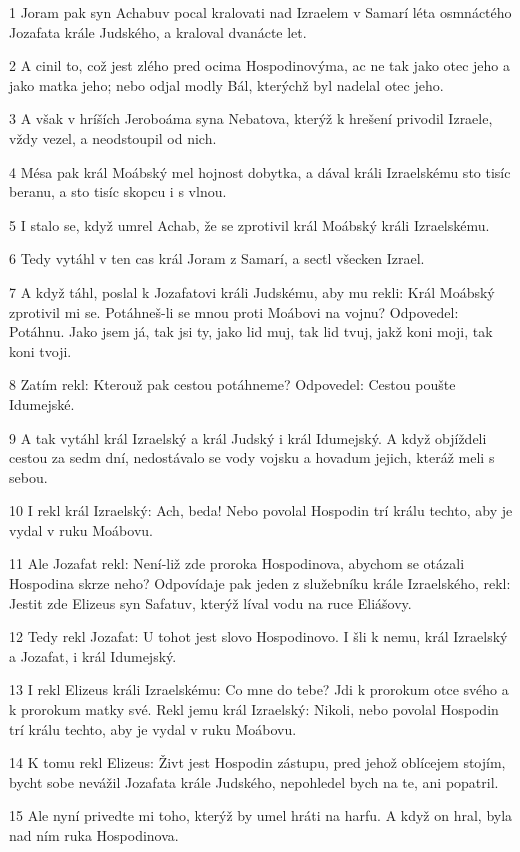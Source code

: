 \par 1 Joram pak syn Achabuv pocal kralovati nad Izraelem v Samarí léta osmnáctého Jozafata krále Judského, a kraloval dvanácte let.
\par 2 A cinil to, což jest zlého pred ocima Hospodinovýma, ac ne tak jako otec jeho a jako matka jeho; nebo odjal modly Bál, kterýchž byl nadelal otec jeho.
\par 3 A však v hríších Jeroboáma syna Nebatova, kterýž k hrešení privodil Izraele, vždy vezel, a neodstoupil od nich.
\par 4 Mésa pak král Moábský mel hojnost dobytka, a dával králi Izraelskému sto tisíc beranu, a sto tisíc skopcu i s vlnou.
\par 5 I stalo se, když umrel Achab, že se zprotivil král Moábský králi Izraelskému.
\par 6 Tedy vytáhl v ten cas král Joram z Samarí, a sectl všecken Izrael.
\par 7 A když táhl, poslal k Jozafatovi králi Judskému, aby mu rekli: Král Moábský zprotivil mi se. Potáhneš-li se mnou proti Moábovi na vojnu? Odpovedel: Potáhnu. Jako jsem já, tak jsi ty, jako lid muj, tak lid tvuj, jakž koni moji, tak koni tvoji.
\par 8 Zatím rekl: Kterouž pak cestou potáhneme? Odpovedel: Cestou poušte Idumejské.
\par 9 A tak vytáhl král Izraelský a král Judský i král Idumejský. A když objíždeli cestou za sedm dní, nedostávalo se vody vojsku a hovadum jejich, kteráž meli s sebou.
\par 10 I rekl král Izraelský: Ach, beda! Nebo povolal Hospodin trí králu techto, aby je vydal v ruku Moábovu.
\par 11 Ale Jozafat rekl: Není-liž zde proroka Hospodinova, abychom se otázali Hospodina skrze neho? Odpovídaje pak jeden z služebníku krále Izraelského, rekl: Jestit zde Elizeus syn Safatuv, kterýž líval vodu na ruce Eliášovy.
\par 12 Tedy rekl Jozafat: U tohot jest slovo Hospodinovo. I šli k nemu, král Izraelský a Jozafat, i král Idumejský.
\par 13 I rekl Elizeus králi Izraelskému: Co mne do tebe? Jdi k prorokum otce svého a k prorokum matky své. Rekl jemu král Izraelský: Nikoli, nebo povolal Hospodin trí králu techto, aby je vydal v ruku Moábovu.
\par 14 K tomu rekl Elizeus: Živt jest Hospodin zástupu, pred jehož oblícejem stojím, bycht sobe nevážil Jozafata krále Judského, nepohledel bych na te, ani popatril.
\par 15 Ale nyní privedte mi toho, kterýž by umel hráti na harfu. A když on hral, byla nad ním ruka Hospodinova.

